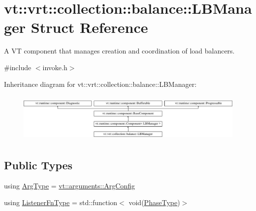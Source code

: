 \hypertarget{structvt_1_1vrt_1_1collection_1_1balance_1_1_l_b_manager}{}\section{vt\+:\+:vrt\+:\+:collection\+:\+:balance\+:\+:L\+B\+Manager Struct Reference}
\label{structvt_1_1vrt_1_1collection_1_1balance_1_1_l_b_manager}


A VT component that manages creation and coordination of load balancers.  




{\ttfamily \#include $<$invoke.\+h$>$}

Inheritance diagram for vt\+:\+:vrt\+:\+:collection\+:\+:balance\+:\+:L\+B\+Manager\+:\begin{figure}[H]
\begin{center}
\leavevmode
\includegraphics[height=2.464246cm]{structvt_1_1vrt_1_1collection_1_1balance_1_1_l_b_manager}
\end{center}
\end{figure}
\subsection*{Public Types}
\begin{DoxyCompactItemize}
\item 
using \hyperlink{structvt_1_1vrt_1_1collection_1_1balance_1_1_l_b_manager_a25c1321de5a8a52b7c2c5d0d400d55d4}{Arg\+Type} = \hyperlink{structvt_1_1arguments_1_1_arg_config}{vt\+::arguments\+::\+Arg\+Config}
\item 
using \hyperlink{structvt_1_1vrt_1_1collection_1_1balance_1_1_l_b_manager_a1bb65b50c7cefb8c139a9f40a83ca18b}{Listener\+Fn\+Type} = std\+::function$<$ void(\hyperlink{namespacevt_a46ce6733d5cdbd735d561b7b4029f6d7}{Phase\+Type})$>$
\end{DoxyCompactItemize}
